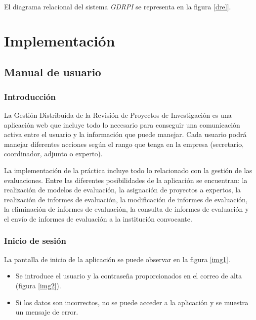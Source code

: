 \documentclass[11pt,a4paper,spanish,twoside]{book}
\begin{document}
El diagrama relacional del sistema \emph{GDRPI} se representa en la figura
\ref{drel}. 

\part{Implementación}

\chapter{Manual de usuario}
\section{Introducción}
La Gestión Distribuída de la Revisión de Proyectos de Investigación es una
aplicación web que incluye todo lo necesario para conseguir una comunicación 
activa entre el usuario y la información que puede manejar. Cada usuario podrá 
manejar diferentes acciones según el rango que tenga en la empresa (secretario,
coordinador, adjunto o experto).

La implementación de la práctica incluye todo lo relacionado con la gestión de
las e\-va\-lua\-cio\-nes. Entre las diferentes posibilidades de la aplicación se
encuentran: la realización de modelos de evaluación, la asignación de proyectos
a expertos, la realización de informes de evaluación, la modificación de
informes de evaluación, la eliminación de informes de evaluación, la consulta
de informes de evaluación y el envío de informes de evaluación a la institución
convocante. 

\section{Inicio de sesión}
La pantalla de inicio de la aplicación se puede observar en la figura
\ref{img1}.


\begin{itemize}
\item Se introduce el usuario y la contraseña proporcionados en el correo de 
alta (figura \ref{img2}).


\item Si los datos son incorrectos, no se puede acceder a la aplicación y se
  muestra un mensaje de error. 
\end{itemize}
\end{document}
